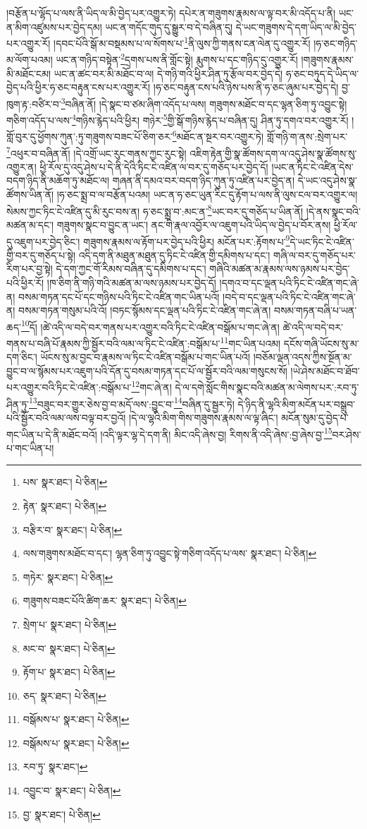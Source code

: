 །བརྩོན་པ་ལྷོད་པ་ལས་ནི་ཡིད་ལ་མི་བྱེད་པར་འགྱུར་ཏེ། དཔེར་ན་གཟུགས་རྣམས་ལ་ལྟ་བར་མི་འདོད་པ་ནི། ཡང་ན་མིག་འཛུམས་པར་བྱེད་དམ། ཡང་ན་གདོང་གུད་དུ་སྒྱུར་བ་དེ་བཞིན་དུ། དེ་ཡང་གཟུགས་དེ་དག་ཡིད་ལ་མི་བྱེད་པར་འགྱུར་རོ། །དབང་པོའི་སྒོ་མ་བསྡམས་པ་ལ་སོགས་པ་\footnote{པས་  སྣར་ཐང་།  པེ་ཅིན། }ནི་ལུས་ཀྱི་གནས་ངན་ལེན་དུ་འགྱུར་རོ། །ཧ་ཅང་གཉིད་མ་ལོག་པའམ། ཡང་ན་གཉིད་བསྟེན་\footnote{རྟེན་  སྣར་ཐང་།  པེ་ཅིན། }དྲགས་པས་ནི་གློང་སྟེ། རྨུགས་པ་དང་གཉིད་དུ་འགྱུར་རོ། །གཟུགས་རྣམས་མི་མཐོང་ངམ། ཡང་ན་ཚང་བར་མི་མཐོང་བ་ལ། དེ་གཉི་གའི་ཕྱིར་ཤིན་ཏུ་རྩོལ་བར་བྱེད་དེ། ཧ་ཅང་བཏུད་དེ་ཡིད་ལ་བྱེད་པའི་ཕྱིར་ཧ་ཅང་བརྟུན་ངས་པར་འགྱུར་རོ། །ཧ་ཅང་བརྟུན་ངས་པའི་ཉེས་པས་ནི་ཧ་ཅང་ཞུམ་པར་བྱེད་དེ། བྱ་ཁུག་རྟ་:བཙིར་བ་\footnote{བརྩིར་བ་  སྣར་ཐང་།  པེ་ཅིན། }བཞིན་ནོ། །དེ་སྣང་བ་ཙམ་ཞིག་འདོད་པ་ལས། གཟུགས་མཐོང་བ་དང་ལྷན་ཅིག་ཏུ་འབྱུང་སྟེ། གཅིག་འདོད་པ་ལས་\footnote{ལས་གཟུགས་མཐོང་བ་དང་། ལྷན་ཅིག་ཏུ་འབྱུང་སྟེ་གཅིག་འདོད་པ་ལས་  སྣར་ཐང་།  པེ་ཅིན། }གཉིས་རྙེད་པའི་ཕྱིར། གཉེར་\footnote{གཏེར་  སྣར་ཐང་།  པེ་ཅིན། }གྱི་སྒོ་གཉིས་རྙེད་པ་བཞིན་དུ། ཤིན་ཏུ་དགའ་བར་འགྱུར་རོ། །གློ་བུར་དུ་ཕྱོགས་ཀུན་:ཏུ་གཟུགས་བཟང་པོ་ཅིག་ཅར་\footnote{གཟུགས་བཟང་པོའི་ཚིག་ཆར་  སྣར་ཐང་།  པེ་ཅིན། }མཐོང་ན་སྔར་བར་འགྱུར་ཏེ། གློ་གཉི་ག་ནས་:སྲེག་པར་\footnote{སྲེག་པ་  སྣར་ཐང་།  པེ་ཅིན། }འཕུར་བ་བཞིན་ནོ། །དེ་འགྲོ་ཡང་རུང་གནས་ཀྱང་རུང་སྟེ། འཇིག་རྟེན་གྱི་སྣ་ཚོགས་དག་ལ་འདུ་ཤེས་སྣ་ཚོགས་སུ་འགྱུར་ན། ཕྱི་རོལ་དུ་འདུ་ཤེས་པ་དེ་ནི་དེའི་ཏིང་ངེ་འཛིན་ལ་བར་དུ་གཅོད་པར་བྱེད་དོ། །ཡང་ན་ཏིང་ངེ་འཛིན་དེས་བདག་ཉིད་ནི་མཆོག་ཏུ་མཐོང་ལ། གཞན་ནི་དམའ་བར་བདག་ཉིད་ཀུན་ཏུ་འཛིན་པར་བྱེད་ན། དེ་ཡང་འདུ་ཤེས་སྣ་ཚོགས་ཡིན་ནོ། །ཧ་ཅང་སྨྲ་བ་ལ་བརྩོན་པའམ། ཡང་ན་ཧ་ཅང་ཡུན་རིང་དུ་རྟོག་པ་ལས་ནི་ལུས་ངལ་བར་འགྱུར་ལ། སེམས་ཀྱང་ཏིང་ངེ་འཛིན་དུ་མི་རུང་བས་ན། ཧ་ཅང་སྨྲ་བ་:མང་ན་\footnote{མང་བ་  སྣར་ཐང་།  པེ་ཅིན། }ཡང་བར་དུ་གཅོད་པ་ཡིན་ནོ། །དེ་ནས་སྣང་བའི་མཚན་མ་དང་། གཟུགས་སྣང་བ་བྱུང་ན་ཡང་། ནང་གི་རྣལ་འབྱོར་ལ་འཇུག་པའི་ཡིད་ལ་བྱེད་པ་བོར་ནས། ཕྱི་རོལ་དུ་འཇུག་པར་བྱེད་ཅིང་། གཟུགས་རྣམས་ལ་རྟོག་པར་བྱེད་པའི་ཕྱིར། མངོན་པར་:རྟོགས་པ་\footnote{རྟོག་པ་  སྣར་ཐང་།  པེ་ཅིན། }དེ་ཡང་ཏིང་ངེ་འཛིན་གྱི་བར་དུ་གཅོད་པ་སྟེ། འདི་དག་ནི་མཐུན་མཐུན་དུ་ཏིང་ངེ་འཛིན་གྱི་དམིགས་པ་དང་། གཞི་ལ་བར་དུ་གཅོད་པར་རིག་པར་བྱ་སྟེ། དེ་དག་ཀྱང་གོ་རིམས་བཞིན་དུ་དམིགས་པ་དང་། གཞིའི་མཚན་མ་རྣམས་ལས་ཉམས་པར་བྱེད་པའི་ཕྱིར་རོ། །ཁ་ཅིག་ནི་གཉི་གའི་མཚན་མ་ལས་ཉམས་པར་བྱེད་དོ། །དགའ་བ་དང་ལྡན་པའི་ཏིང་ངེ་འཛིན་གང་ཞེ་ན། བསམ་གཏན་དང་པོ་དང་གཉིས་པའི་ཏིང་ངེ་འཛིན་གང་ཡིན་པའོ། །བདེ་བ་དང་ལྡན་པའི་ཏིང་ངེ་འཛིན་གང་ཞེ་ན། བསམ་གཏན་གསུམ་པའི་འོ། །བཏང་སྙོམས་དང་ལྡན་པའི་ཏིང་ངེ་འཛིན་གང་ཞེ་ན། བསམ་གཏན་བཞི་པ་ཡན་ཆད་\footnote{ཅད་  སྣར་ཐང་།  པེ་ཅིན། }དོ། །ཚེ་འདི་ལ་བདེ་བར་གནས་པར་འགྱུར་བའི་ཏིང་ངེ་འཛིན་བསྒོམ་པ་གང་ཞེ་ན། ཚེ་འདི་ལ་བདེ་བར་གནས་པ་བཞི་པོ་རྣམས་ཀྱི་སྦྱོར་བའི་ལམ་ལ་ཏིང་ངེ་འཛིན་:བསྒོམ་པ་\footnote{བསྒོམས་པ་  སྣར་ཐང་།  པེ་ཅིན། }གང་ཡིན་པའམ། དངོས་གཞི་ཡོངས་སུ་མ་དག་ཅིང་། ཡོངས་སུ་མ་བྱང་བ་རྣམས་ལ་ཏིང་ངེ་འཛིན་བསྒོམ་པ་གང་ཡིན་པའོ། །བཅོམ་ལྡན་འདས་ཀྱིས་སྔོན་མ་བྱུང་བ་ལ་སྙོམས་པར་འཇུག་པའི་དོན་དུ་བསམ་གཏན་དང་པོ་ལ་སྦྱོར་བའི་ལམ་གསུངས་སོ། །ཡེ་ཤེས་མཐོང་བ་ཐོབ་པར་འགྱུར་བའི་ཏིང་ངེ་འཛིན་:བསྒོམ་པ་\footnote{བསྒོམས་པ་  སྣར་ཐང་།  པེ་ཅིན། }གང་ཞེ་ན། དེ་ལ་དགེ་སློང་གིས་སྣང་བའི་མཚན་མ་ལེགས་པར་:རབ་ཏུ་ཤིན་ཏུ་\footnote{རབ་ཏུ་  སྣར་ཐང་། }བཟུང་བར་གྱུར་ཅེས་བྱ་བ་མདོ་ལས་:བྱུང་བ་\footnote{འབྱུང་བ་  སྣར་ཐང་།  པེ་ཅིན། }བཞིན་དུ་སྦྱར་ཏེ། དེ་ཉིད་ནི་ལྷའི་མིག་མངོན་པར་བསྒྲུབ་པའི་སྦྱོར་བའི་ལམ་ལས་བལྟ་བར་བྱའོ། །དེ་ལ་ལྷའི་མིག་གིས་གཟུགས་རྣམས་ལ་ལྟ་ཞིང་། མངོན་སུམ་དུ་བྱེད་པ་གང་ཡིན་པ་དེ་ནི་མཐོང་བའོ། །འདི་ལྟར་ལྷ་དེ་དག་ནི། མིང་འདི་ཞེས་བྱ། རིགས་ནི་འདི་ཞེས་:བྱ་ཞེས་བྱ་\footnote{བྱ་  སྣར་ཐང་།  པེ་ཅིན། }བར་ཤེས་པ་གང་ཡིན་པ། 